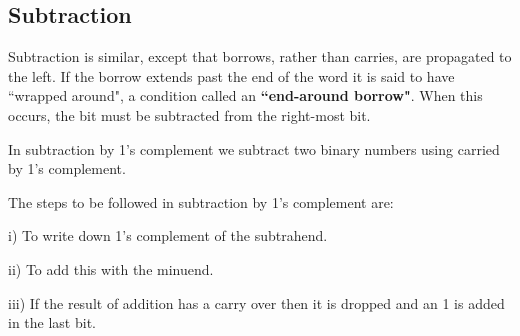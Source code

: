 
\vfill



%

\subsection*{Subtraction}

Subtraction is similar, except that borrows, rather than carries, are propagated to the left. If the borrow extends past the end of the word it is said to have ``wrapped around", a condition called an \textbf{``end-around borrow"}. When this occurs, the bit must be subtracted from the right-most bit. %

In subtraction by 1's complement we subtract two binary numbers using carried by 1's complement.

The steps to be followed in subtraction by 1's complement are:

i) To write down 1's complement of the subtrahend.

ii) To add this with the minuend.

iii) If the result of addition has a carry over then it is dropped and an 1 is added in the last bit.

